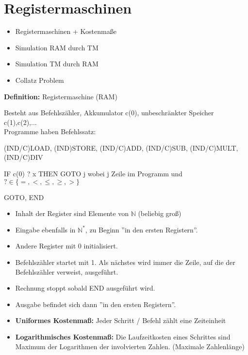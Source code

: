 \documentclass[a4paper,graphics,11pt]{article}
\begin{document}
\section{Registermaschinen}

\begin{itemize}
    \item Registermaschinen + Kostenmaße
    \item Simulation RAM durch TM
    \item Simulation TM durch RAM
    \item Collatz Problem
\end{itemize}

\textbf{Definition:} Registermaschine (RAM)

Besteht aus Befehlszähler, Akkumulator c(0), unbeschränkter Speicher c(1),c(2),...\\
Programme haben Befehlssatz:

(IND/C)LOAD, (IND)STORE, (IND/C)ADD, (IND/C)SUB, (IND/C)MULT, (IND/C)DIV

IF c(0) ? x THEN GOTO j \qquad wobei j Zeile im Programm und $? \in \{=,<,\leq,\geq,>\}$

GOTO, END


\begin{itemize}
    \item Inhalt der Register sind Elemente von $\mathbb{N}$ (beliebig groß)
    \item Eingabe ebenfalls in $\mathbb{N}^*$, zu Beginn ''in den ersten Registern''.
    \item Andere Register mit 0 initialisiert.
    \item Befehlszähler startet mit 1. Als nächstes wird immer die Zeile, auf die der Befehlszähler
        verweist, ausgeführt.
    \item Rechnung stoppt sobald END ausgeführt wird.
    \item Ausgabe befindet sich dann ''in den ersten Registern''.

    \strut

    \item \textbf{Uniformes Kostenmaß:} Jeder Schritt / Befehl zählt eine Zeiteinheit
    \item \textbf{Logarithmisches Kostenmaß:} Die Laufzeitkosten eines Schrittes sind Maximum der
Logarithmen der involvierten Zahlen. (Maximale Zahlenlänge)

\end{itemize}

\newpage
\end{document}
